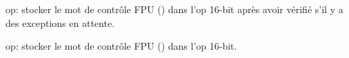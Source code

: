   \item[FSTCW] op: stocker le mot de contrôle FPU () dans l'op 16-bit
  après avoir vérifié s'il y a des exceptions en attente.
  \item[FNSTCW] op: stocker le mot de contrôle FPU () dans l'op 16-bit.

